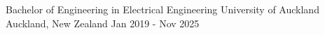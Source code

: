 
\begin{cventries}
  \cventry
    {Bachelor of Engineering in Electrical Engineering} %
    {University of Auckland} %
    {Auckland, New Zealand} %
    {Jan 2019 - Nov 2025} %
    \item{}
    \vspace{-15mm}

\end{cventries}
